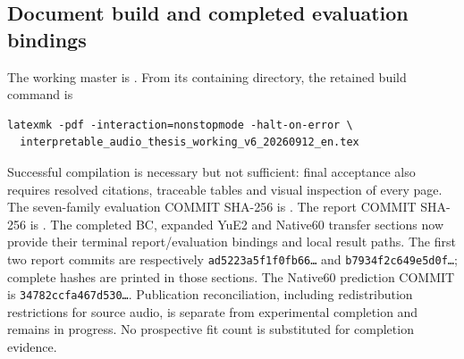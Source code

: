 \subsection{Document build and completed evaluation bindings}
The working master is
.
From its containing directory, the retained build command is
\begin{verbatim}
latexmk -pdf -interaction=nonstopmode -halt-on-error \
  interpretable_audio_thesis_working_v6_20260912_en.tex
\end{verbatim}
Successful compilation is necessary but not sufficient: final acceptance
also requires resolved citations, traceable tables and visual inspection of
every page. The seven-family evaluation COMMIT SHA-256 is
.
The report COMMIT SHA-256 is
.
The completed BC, expanded YuE2 and Native60 transfer sections now provide
their terminal report/evaluation bindings and local result paths. The first two
report commits are respectively \texttt{ad5223a5f1f0fb66\ldots} and
\texttt{b7934f2c649e5d0f\ldots}; complete hashes are printed in those sections.
The Native60 prediction COMMIT is \texttt{34782ccfa467d530\ldots}.
Publication reconciliation, including redistribution restrictions for source
audio, is separate from experimental completion and remains in progress.
No prospective fit count is substituted for completion evidence.\par
\endgroup
